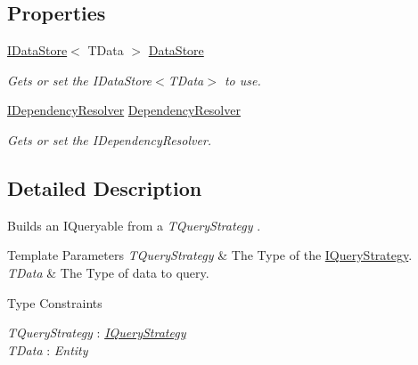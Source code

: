 \subsection*{Properties}
\begin{DoxyCompactItemize}
\item 
\hyperlink{interfaceCqrs_1_1DataStores_1_1IDataStore}{I\+Data\+Store}$<$ T\+Data $>$ \hyperlink{classCqrs_1_1Repositories_1_1Queries_1_1QueryBuilder_a8a64851b3bf82ed5d2e708cd39d71890_a8a64851b3bf82ed5d2e708cd39d71890}{Data\+Store}
\begin{DoxyCompactList}\small\item\em Gets or set the I\+Data\+Store$<$\+T\+Data$>$ to use. \end{DoxyCompactList}\item 
\hyperlink{interfaceCqrs_1_1Configuration_1_1IDependencyResolver}{I\+Dependency\+Resolver} \hyperlink{classCqrs_1_1Repositories_1_1Queries_1_1QueryBuilder_aef22b10001de3e15a2817f8446a5b5f4_aef22b10001de3e15a2817f8446a5b5f4}{Dependency\+Resolver}
\begin{DoxyCompactList}\small\item\em Gets or set the I\+Dependency\+Resolver. \end{DoxyCompactList}\end{DoxyCompactItemize}


\subsection{Detailed Description}
Builds an I\+Queryable from a {\itshape T\+Query\+Strategy} . 


\begin{DoxyTemplParams}{Template Parameters}
{\em T\+Query\+Strategy} & The Type of the \hyperlink{interfaceCqrs_1_1Repositories_1_1Queries_1_1IQueryStrategy}{I\+Query\+Strategy}.\\
\hline
{\em T\+Data} & The Type of data to query.\\
\hline
\end{DoxyTemplParams}
\begin{Desc}
\item[Type Constraints]\begin{description}
\item[{\em T\+Query\+Strategy} : {\em \hyperlink{interfaceCqrs_1_1Repositories_1_1Queries_1_1IQueryStrategy}{I\+Query\+Strategy}}]\item[{\em T\+Data} : {\em Entity}]\end{description}
\end{Desc}



